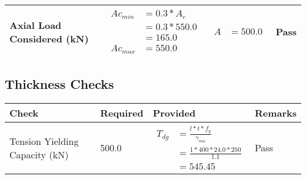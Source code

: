 \documentclass{article}%
\begin{document}
\begin{longtable}{|p{2.5cm}|p{4.5cm}|p{8cm}|p{1cm}|}
\hline%
Axial Load Considered (kN)&$\begin{aligned} Ac_{min} &= 0.3 * A_c\\ &= 0.3 *550.0\\ &=165.0\\ Ac_{max} &=550.0\end{aligned}$&$\begin{aligned} A &=500.0\end{aligned}$&Pass\\%
\hline%
\end{longtable}

%
\newpage%
\subsection{Thickness Checks}%
\label{subsec:ThicknessChecks}%
\renewcommand{\arraystretch}{1.2}%
\begin{longtable}{|p{2.5cm}|p{5cm}|p{7.5cm}|p{1cm}|}%
\hline%
\rowcolor{OsdagGreen}%
Check&Required&Provided&Remarks\\%
\hline%
\endhead%
\hline%
Tension Yielding Capacity (kN)&500.0&$\begin{aligned} T_{dg} &= \frac{l*t*f_y}{\gamma_{mo}}\\ &=\frac{1*400*24.0*250}{1.1}\\ &=545.45\end{aligned}$&Pass\\%
\hline%
\end{longtable}

%
\newpage%
\end{document}
